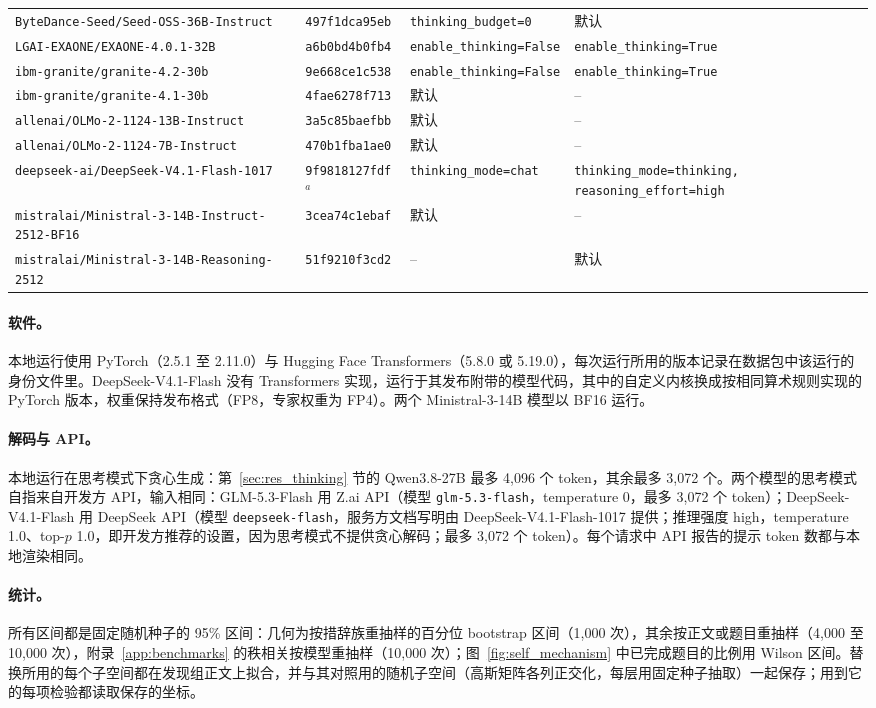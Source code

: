 \begin{table}[htbp]
\begin{tabular}{llp{3.2cm}p{3.5cm}}
\texttt{ByteDance-Seed/Seed-OSS-36B-Instruct} & \texttt{497f1dca95eb} & \texttt{thinking\_budget=0} & 默认 \\
\texttt{LGAI-EXAONE/EXAONE-4.0.1-32B} & \texttt{a6b0bd4b0fb4} & \texttt{enable\_thinking=False} & \texttt{enable\_thinking=True} \\
\texttt{ibm-granite/granite-4.2-30b} & \texttt{9e668ce1c538} & \texttt{enable\_thinking=False} & \texttt{enable\_thinking=True} \\
\texttt{ibm-granite/granite-4.1-30b} & \texttt{4fae6278f713} & 默认 & -- \\
\texttt{allenai/OLMo-2-1124-13B-Instruct} & \texttt{3a5c85baefbb} & 默认 & -- \\
\texttt{allenai/OLMo-2-1124-7B-Instruct} & \texttt{470b1fba1ae0} & 默认 & -- \\
\texttt{deepseek-ai/DeepSeek-V4.1-Flash-1017} & \texttt{9f9818127fdf}$^{a}$ & \texttt{thinking\_mode=chat} & \texttt{thinking\_mode=thinking, reasoning\_effort=high} \\
\texttt{mistralai/Ministral-3-14B-Instruct-2512-BF16} & \texttt{3cea74c1ebaf} & 默认 & -- \\
\texttt{mistralai/Ministral-3-14B-Reasoning-2512} & \texttt{51f9210f3cd2} & -- & 默认 \\
\bottomrule
\end{tabular}
\end{table}

\paragraph{软件。} 本地运行使用 PyTorch（2.5.1 至 2.11.0）与 Hugging Face Transformers（5.8.0 或 5.19.0），每次运行所用的版本记录在数据包中该运行的身份文件里。DeepSeek-V4.1-Flash 没有 Transformers 实现，运行于其发布附带的模型代码，其中的自定义内核换成按相同算术规则实现的 PyTorch 版本，权重保持发布格式（FP8，专家权重为 FP4）。两个 Ministral-3-14B 模型以 BF16 运行。

\paragraph{解码与 API。} 本地运行在思考模式下贪心生成：第~\ref{sec:res_thinking} 节的 Qwen3.8-27B 最多 4,096 个 token，其余最多 3,072 个。两个模型的思考模式自指来自开发方 API，输入相同：GLM-5.3-Flash 用 Z.ai API（模型 \texttt{glm-5.3-flash}，temperature 0，最多 3,072 个 token）；DeepSeek-V4.1-Flash 用 DeepSeek API（模型 \texttt{deepseek-flash}，服务方文档写明由 DeepSeek-V4.1-Flash-1017 提供；推理强度 high，temperature 1.0、top-$p$ 1.0，即开发方推荐的设置，因为思考模式不提供贪心解码；最多 3,072 个 token）。每个请求中 API 报告的提示 token 数都与本地渲染相同。

\paragraph{统计。} 所有区间都是固定随机种子的 95\% 区间：几何为按措辞族重抽样的百分位 bootstrap 区间（1,000 次），其余按正文或题目重抽样（4,000 至 10,000 次），附录~\ref{app:benchmarks} 的秩相关按模型重抽样（10,000 次）；图~\ref{fig:self_mechanism} 中已完成题目的比例用 Wilson 区间。替换所用的每个子空间都在发现组正文上拟合，并与其对照用的随机子空间（高斯矩阵各列正交化，每层用固定种子抽取）一起保存；用到它的每项检验都读取保存的坐标。
